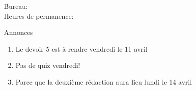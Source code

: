 \documentclass{beamer}
\subtitle[Adjectifs interrogatifs et domiciles]{Les adjectifs interrogatifs et les domiciles}
\begin{document}
  \begin{frame}
    \titlepage
    \tiny{Bureau: \\
          Heures de permanence: }
  \end{frame}

  \begin{frame}{Annonces}
    \begin{enumerate}
      \item Le devoir 5 est à rendre vendredi le 11 avril
      \item Pas de quiz vendredi!
      \item Parce que la deuxième rédaction aura lieu lundi le 14 avril
    \end{enumerate}
  \end{frame}

\end{document}
